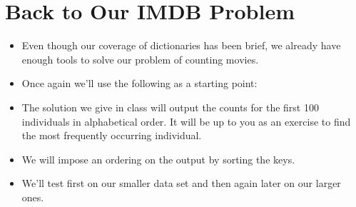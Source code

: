 \documentclass[letterpaper,10pt,english]{sphinxmanual}
\begin{document}
\section{Back to Our IMDB Problem}
\label{\detokenize{lecture_notes/lec16_dictionaries1:back-to-our-imdb-problem}}\begin{itemize}
\item {} 
Even though our coverage of dictionaries has been brief, we already
have enough tools to solve our problem of counting movies.

\item {} 
Once again we’ll use the following as a starting point:

\begin{sphinxVerbatim}[commandchars=\\\{\}]
  
  
    
      
      \PYG{p}{[}\PYG{p}{]}
\end{sphinxVerbatim}

\item {} 
The solution we give in class will output the counts for the first
100 individuals in alphabetical order.  It will be up to you as an
exercise to find the most frequently occurring individual.

\item {} 
We will impose an ordering on the output by sorting the keys.

\item {} 
We’ll test first on our smaller data set and then again later on our
larger ones.

\end{itemize}
\end{document}
